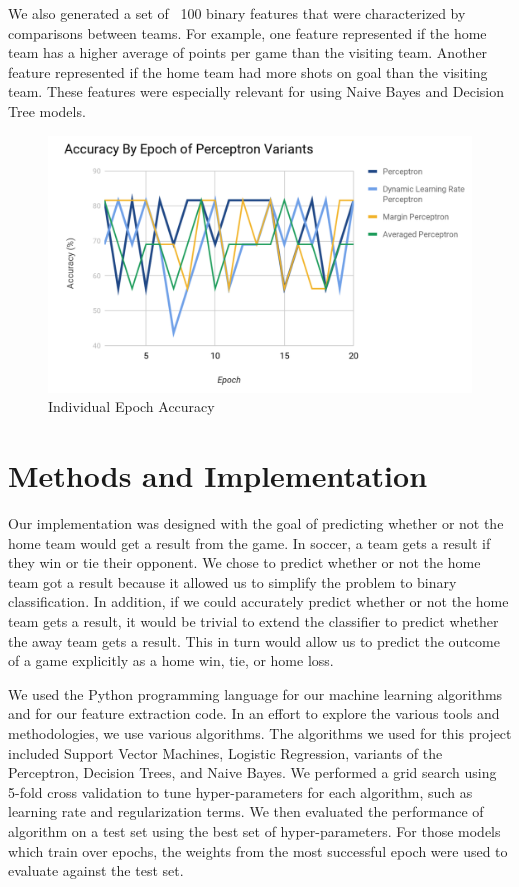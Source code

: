 We also generated a set of ~100 binary features that were characterized by comparisons between teams. For example, one feature represented if the home team has a higher average of points per game than the visiting team. Another feature represented if the home team had more shots on goal than the visiting team. These features were especially relevant for using Naive Bayes and Decision Tree models.

\begin{figure}[t]
\includegraphics[width=12cm]{epoch.png}
\caption{Individual Epoch Accuracy}
\label{figure1}
\end{figure}

\section{Methods and Implementation}
Our implementation was designed with the goal of predicting whether or not the home team would get a result from the game. In soccer, a team gets a result if they win or tie their opponent. We chose to predict whether or not the home team got a result because it allowed us to simplify the problem to binary classification. In addition, if we could accurately predict whether or not the home team gets a result, it would be trivial to extend the classifier to predict whether the away team gets a result. This in turn would allow us to predict the outcome of a game explicitly as a home win, tie, or home loss.

We used the Python programming language for our machine learning algorithms and for our feature extraction code. In an effort to explore the various tools and methodologies, we use various algorithms. The algorithms we used for this project included Support Vector Machines, Logistic Regression, variants of the Perceptron, Decision Trees, and Naive Bayes. We performed a grid search using 5-fold cross validation to tune hyper-parameters for each algorithm, such as learning rate and regularization terms. We then evaluated the performance of algorithm on a test set using the best set of hyper-parameters. For those models which train over epochs, the weights from the most successful epoch were used to evaluate against the test set.


